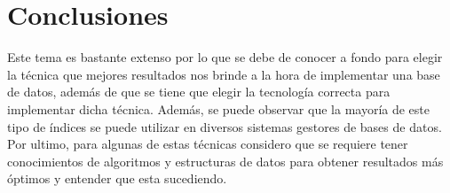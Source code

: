 \documentclass[12pt, titlepage]{article}
\begin{document}
	\section{Conclusiones}
	Este tema es bastante extenso por lo que se debe de conocer a fondo para elegir la técnica que mejores resultados nos brinde a la hora de implementar una base de datos, además de que se tiene que elegir la tecnología correcta para implementar dicha técnica.
	Además, se puede observar que la mayoría de este tipo de índices se puede utilizar en diversos sistemas gestores de bases de datos.
	Por ultimo, para algunas de estas técnicas considero que se requiere tener conocimientos de algoritmos y estructuras de datos para obtener resultados más óptimos y entender que esta sucediendo.
	 
	
\end{document}
